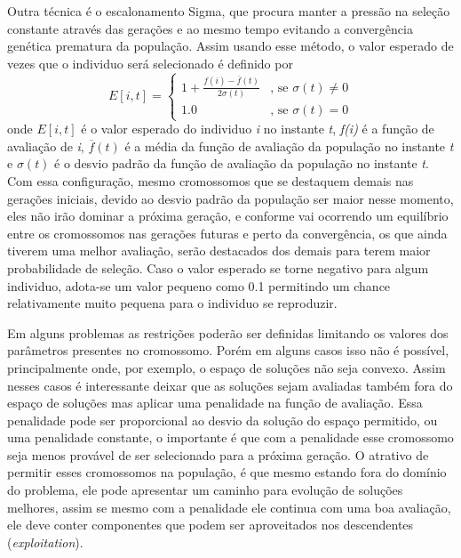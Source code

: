 Outra técnica é o escalonamento Sigma, que procura manter a pressão na seleção constante através das gerações e ao mesmo tempo evitando a convergência genética prematura da população. Assim usando esse método, o valor esperado de vezes que o individuo será selecionado é definido por 
\begin{equation*}
E[i,t] = \left \lbrace  \begin{array}{cc} 1 + \frac{f(i) - \overline{f}(t)}{2\sigma(t)} & \text{, se } \sigma(t) \neq 0 \\
					1.0 & \text{, se } \sigma(t) = 0  \end{array}  \right.
\end{equation*}
onde \(E[i,t]\) é o valor esperado do individuo \textit{i} no instante \textit{t}, \textit{f(i)} é a função de avaliação de \textit{i}, \(\overline{f}(t)\) é a média da função de avaliação da população no instante \textit{t} e \(\sigma(t)\) é o desvio padrão da função de avaliação da população no instante \textit{t}. Com essa configuração, mesmo cromossomos que se destaquem demais nas gerações iniciais, devido ao desvio padrão da população ser maior nesse momento, eles não irão dominar a próxima geração, e conforme vai ocorrendo um equilíbrio entre os cromossomos nas gerações futuras e perto da convergência, os que ainda tiverem uma melhor avaliação, serão destacados dos demais para terem maior probabilidade de seleção. Caso o valor esperado se torne negativo para algum individuo, adota-se um valor pequeno como 0.1 permitindo um chance relativamente muito pequena para o individuo se reproduzir. \cite{Mitchell1996}

Em alguns problemas as restrições poderão ser definidas limitando os valores dos parâmetros presentes no cromossomo. Porém em alguns casos isso não é possível, principalmente onde, por exemplo, o espaço de soluções não seja convexo. Assim nesses casos é interessante deixar que as soluções sejam avaliadas também fora do espaço de soluções mas aplicar uma penalidade na função de avaliação. Essa penalidade pode ser proporcional ao desvio da solução do espaço permitido, ou uma penalidade constante, o importante é que com a penalidade esse cromossomo seja menos provável de ser selecionado para a próxima geração. O atrativo de permitir esses cromossomos na população, é que mesmo estando fora do domínio do problema, ele pode apresentar um caminho para evolução de soluções melhores, assim se mesmo com a penalidade ele continua com uma boa avaliação, ele deve conter componentes que podem ser aproveitados nos descendentes (\textit{exploitation}).

